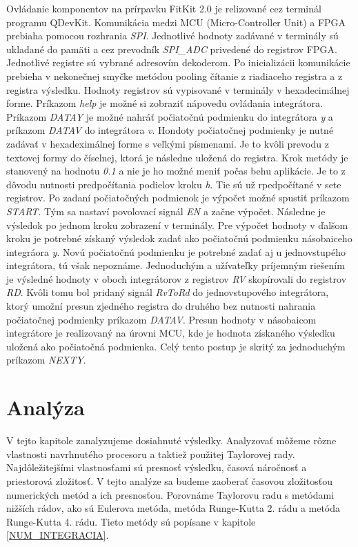 Ovládanie komponentov na prírpavku FitKit 2.0 je relizované cez terminál programu QDevKit. Komunikácia medzi MCU (Micro-Controller Unit) a FPGA prebiaha pomocou rozhrania \textit{SPI}. Jednotlivé hodnoty zadávané v terminály sú ukladané do pamäti a cez prevodník \textit{SPI\_ADC} privedené do registrov FPGA. Jednotlivé registre sú vybrané adresovím dekoderom. Po inicializácii komunikácie prebieha v nekonečnej smyčke metódou pooling čítanie z riadiaceho registra a z registra výsledku. Hodnoty registrov sú vypisované v terminály v hexadecimálnej forme. Príkazom \textit{help} je možné si zobraziť nápovedu ovládania integrátora. Príkazom \textit{DATAY} je možné nahráť počiatočnú podmienku do integrátora \textit{y} a príkazom \textit{DATAV} do integrátora \textit{v}. Hondoty počiatočnej podmienky je nutné zadávať v hexadeximálnej forme s veľkými písmenami. Je to kvôli prevodu z textovej formy do číselnej, ktorá je následne uložená do registra. Krok metódy je stanovený na hodnotu \textit{0.1} a nie je ho možné meniť počas behu aplikácie. Je to z dôvodu nutnosti predpočítania podielov kroku \textit{h}. Tie sú už rpedpočítané v sete registrov. Po zadaní počiatočných podmienok je výpočet možné spustiť príkazom \textit{START}. Tým sa nastaví povolovací signál \textit{EN} a začne výpočet. Následne je výsledok po jednom kroku zobrazení v terminály. Pre výpočet hodnoty v ďalšom kroku je potrebné získaný výsledok zadať ako počiatočnú podmienku násobaiceho integráora \textit{y}. Novú počiatočnú podmienku je potrebné zadať aj u jednovstupého integrátora, tú však nepoznáme. Jednoduchým a užívateľky príjemným riešením je výsledné hodnoty v oboch integrátorov z registrov \textit{RV} skopírovali do registrov \textit{RD}. Kvôli tomu bol pridaný signál \textit{RvToRd} do jednovstupového integrátora, ktorý umožní presun zjedného registra do druhého bez nutnosti nahrania počiatočnej podmienky príkazom \textit{DATAV}. Presun hodnoty v násobaicom integrátore je realizovaný na úrovni MCU, kde je hodnota získaného výsledku uložená ako počiatočná podmienka. Celý tento postup je skritý za jednoduchým príkazom \textit{NEXTY}.


\chapter{Analýza}
V tejto kapitole zanalyzujeme dosiahnuté výsledky. Analyzovať môžeme rôzne vlastnosti navrhnutého procesoru a taktiež použitej Taylorovej rady. Najdôležitejšími vlastnosťami sú presnosť výsledku, časová náročnosť a priestorová zložitosť. V tejto analýze sa budeme zaoberať časovou zložitosťou numerických metód a ich presnosťou. Porovnáme Taylorovu radu s metódami nižších rádov, ako sú Eulerova metóda, metóda Runge-Kutta 2. rádu a metóda Runge-Kutta 4. rádu. Tieto metódy sú popísane v kapitole \ref{NUM_INTEGRACIA}.

